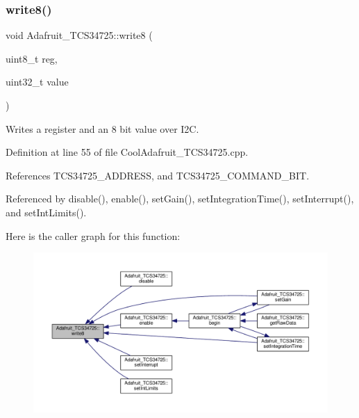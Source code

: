 \subsubsection{\texorpdfstring{write8()}{write8()}}
{\footnotesize\ttfamily void Adafruit\+\_\+\+T\+C\+S34725\+::write8 (\begin{DoxyParamCaption}\item[{uint8\+\_\+t}]{reg,  }\item[{uint32\+\_\+t}]{value }\end{DoxyParamCaption})}



Writes a register and an 8 bit value over I2C. 



Definition at line 55 of file Cool\+Adafruit\+\_\+\+T\+C\+S34725.\+cpp.



References T\+C\+S34725\+\_\+\+A\+D\+D\+R\+E\+SS, and T\+C\+S34725\+\_\+\+C\+O\+M\+M\+A\+N\+D\+\_\+\+B\+IT.



Referenced by disable(), enable(), set\+Gain(), set\+Integration\+Time(), set\+Interrupt(), and set\+Int\+Limits().

Here is the caller graph for this function\+:
\nopagebreak
\begin{figure}[H]
\begin{center}
\leavevmode
\includegraphics[width=350pt]{df/d54/class_adafruit___t_c_s34725_aa526557ad0d76b3b6e31e6197de583e6_icgraph}
\end{center}
\end{figure}
\mbox{\label{class_adafruit___t_c_s34725_a3ffafbdd475d6baf9abda8dd067b5319}} 
